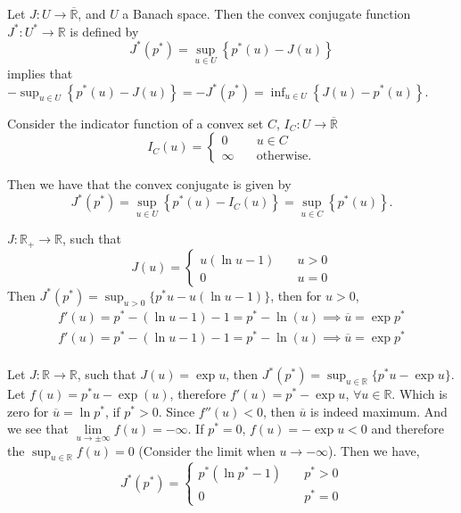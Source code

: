 \begin{definition}[Duality]
Let $J:U\rightarrow \overline{\mathbb{R}}$, and $U$ a Banach space. Then the convex conjugate function $J^*: U^* \rightarrow \mathbb{R}$ is defined by
\[
	J^*(p^*)=\sup_{u\in U} \left\lbrace p^*(u)-J(u)\right\rbrace
\]
implies that $-\sup_{u\in U} \left\lbrace p^*(u)-J(u) \right\rbrace= -J^*(p^*)= \inf_{u\in U} \left\lbrace J(u)-p^*(u)\right\rbrace$.
\end{definition}

\begin{example}
	Consider the indicator function of a convex set $C$, $I_C: U\rightarrow\overline{\mathbb{R}}$
	\[
	I_C(u)=
	\left\lbrace
	\begin{array}{cl}
	0&\quad u \in C\\
	\infty & \quad \text{otherwise}.
	\end{array}
	\right.
	\]
	
	Then we have that the convex conjugate is given by
	\[J^*(p^*)=\sup_{u\in U}\left\lbrace p^*(u)-I_C(u)\right\rbrace=\sup_{u\in C}\left\lbrace p^*(u)\right\rbrace.\]
\end{example}
\begin{example}
	$J: \mathbb{R}_+\rightarrow \mathbb{R}$, such that
	\begin{equation*}
	J(u)=\left\lbrace
	\begin{array}{ll}
		u(\ln u -1) & \quad u >0 \\
		0 & \quad u =0
	\end{array}		
	\right.
	\end{equation*}
	Then $J^*(p^*)=\sup_{u>0} \{p^*u-u(\ln u -1)\}$, then for $u>0$,
	\begin{align*}
		f'(u)=p^*-(\ln u -1) -1 = p^* -\ln(u) \implies \overline{u}=\exp p^* \\
		f'(u)=p^*-(\ln u -1) -1 = p^* -\ln(u) \implies \overline{u}=\exp p^* \\
	\end{align*}
\end{example}
\begin{example}
	Let $J:\mathbb{R}\rightarrow \mathbb{R}$, such that $J(u)=\exp u$, then $J^*(p^*)=\sup_{u\in \mathbb{R}} \lbrace p^*u -\exp u\rbrace$. Let $f(u)=p^*u-\exp(u)$, therefore $f'(u)=p^*-\exp u$, $\forall u \in \mathbb{R}$. Which is zero for $\overline{u} = \ln p^*$, if $p^*>0$. Since $f''(u)<0$, then $\overline{u}$ is indeed maximum. And we see that $\lim\limits_{u\rightarrow \pm \infty} f(u)=-\infty$. If $p^*=0$, $f(u)=-\exp u < 0$ and therefore the $\sup_{u \in \mathbb{R}} f(u)=0$ (Consider the limit when $u \rightarrow -\infty$). Then we have,
	\begin{equation*}
		J^*(p^*)=\left\lbrace 
		\begin{array}{cr}
			p^*(\ln p^*-1) & \quad p^*>0 \\
			0 & \quad p^*=0
		\end{array}		
		\right.
	\end{equation*}	
\end{example}
